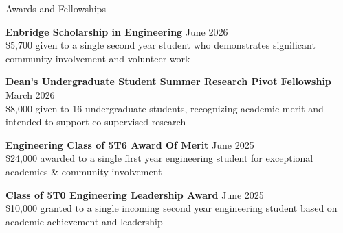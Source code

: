 \documentclass{resume}
\begin{document}

\begin{rSection}{Awards and Fellowships}

\item {\bf Enbridge Scholarship in Engineering} \hfill June 2026 \\
\$5,700 given to a single second year student who demonstrates significant community involvement and volunteer work
\item {\bf Dean's Undergraduate Student Summer Research Pivot Fellowship} \hfill March 2026 \\
\$8,000 given to 16 undergraduate students, recognizing academic merit and intended to support co-supervised research
\item {\bf Engineering Class of 5T6 Award Of Merit} \hfill June 2025 \\
\$24,000 awarded to a single first year engineering student for exceptional academics \& community involvement
\item {\bf Class of 5T0 Engineering Leadership Award} \hfill June 2025 \\
\$10,000 granted to a single incoming second year engineering student based on academic achievement and leadership

\end{rSection}
\end{document}
